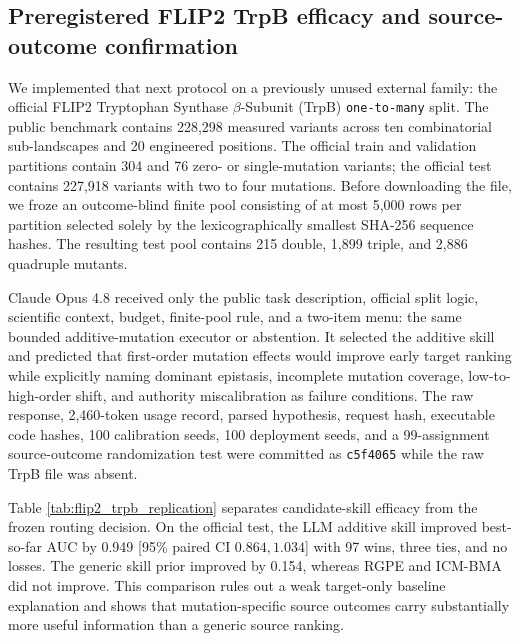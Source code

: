 \documentclass[pdflatex,sn-nature]{sn-jnl}
\newcommand{\code}[1]{\texttt{#1}}
\begin{document}
\begin{appendices}
\subsection{Preregistered FLIP2 TrpB efficacy and source-outcome confirmation}
\label{sec:flip2_trpb_replication}

We implemented that next protocol on a previously unused external family: the
official FLIP2 Tryptophan Synthase $\beta$-Subunit (TrpB)
\code{one-to-many} split. The public benchmark contains 228,298 measured
variants across ten combinatorial sub-landscapes and 20 engineered positions.
The official train and validation partitions contain 304 and 76 zero- or
single-mutation variants; the official test contains 227,918 variants with two
to four mutations. Before downloading the file, we froze an outcome-blind
finite pool consisting of at most 5,000 rows per partition selected solely by
the lexicographically smallest SHA-256 sequence hashes. The resulting test
pool contains 215 double, 1,899 triple, and 2,886 quadruple mutants.

Claude Opus 4.8 received only the public task description, official split
logic, scientific context, budget, finite-pool rule, and a two-item menu: the
same bounded additive-mutation executor or abstention. It selected the
additive skill and predicted that first-order mutation effects would improve
early target ranking while explicitly naming dominant epistasis, incomplete
mutation coverage, low-to-high-order shift, and authority miscalibration as
failure conditions. The raw response, 2,460-token usage record, parsed
hypothesis, request hash, executable code hashes, 100 calibration seeds, 100
deployment seeds, and a 99-assignment source-outcome randomization test were
committed as \code{c5f4065} while the raw TrpB file was absent.

Table \ref{tab:flip2_trpb_replication} separates candidate-skill efficacy from
the frozen routing decision. On the official test, the LLM additive skill
improved best-so-far AUC by 0.949 [95\% paired CI $0.864,1.034$] with 97 wins,
three ties, and no losses. The generic skill prior improved by 0.154, whereas
RGPE and ICM-BMA did not improve. This comparison rules out a weak target-only
baseline explanation and shows that mutation-specific source outcomes carry
substantially more useful information than a generic source ranking.


\end{appendices}
\end{document}
